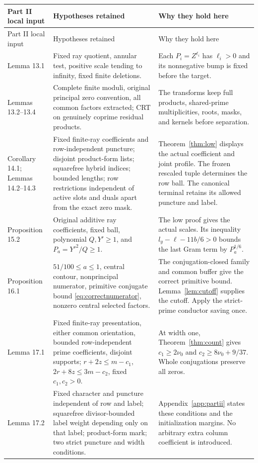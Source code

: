 \begin{longtable}{@{}>{\raggedright\arraybackslash}p{}>{\raggedright\arraybackslash}p{}>{\raggedright\arraybackslash}p{}@{}}
\toprule
Part II local input&Hypotheses retained&Why they hold here\\
\midrule
\endfirsthead
\toprule
Part II local input&Hypotheses retained&Why they hold here\\
\midrule
\endhead
\bottomrule
\endfoot
Lemma 13.1&Fixed ray quotient, annular test, positive scale tending to infinity, fixed finite deletions.&Each $P_i=Z^{\ell_i}$ has $\ell_i>0$ and its nonnegative bump is fixed before the target.\\
Lemmas 13.2--13.4&Complete finite moduli, original principal zero convention, all common factors extracted; CRT on genuinely coprime residual products.&The transforms keep full products, shared-prime multiplicities, roots, masks, and kernels before separation.\\
Corollary 14.1; Lemmas 14.2--14.3&Fixed finite-ray coefficients and row-independent puncture; disjoint product-form lists; squarefree hybrid indices; bounded lengths; row restrictions independent of active slots and duals apart from the exact zero mask.&Theorem~\ref{thm:low} displays the actual coefficient and joint profile. The frozen rescaled tuple determines the row ball. The canonical terminal retains its allowed puncture and label.\\
Proposition 15.2&Original additive ray coefficients, fixed ball, polynomial $Q,Y'\ge1$, and $P_a=Y'^2/Q\ge1$.&The low proof gives the actual scales. Its inequality $l_y-\ell-11b/6>0$ bounds the last Gram term by $P_a^{1/6}$.\\
Proposition 16.1&$51/100\le a\le1$, central contour, nonprincipal numerator, primitive conjugate bound \eqref{eq:correctnumerator}, nonzero central selected factors.&The conjugation-closed family and common buffer give the correct primitive bound. Lemma~\ref{lem:cutoff} supplies the cutoff. Apply the strict-prime conductor saving once.\\
Lemma 17.1&Fixed finite-ray presentation, either common orientation, bounded row-independent prime coefficients, disjoint supports; $r+2z\le m-c_1$, $2r+8z\le3m-c_2$, fixed $c_1,c_2>0$.&At width one, Theorem~\ref{thm:count} gives $c_1\ge2\nu_0$ and $c_2\ge8\nu_0+9/37$. Whole conjugations preserve all zeros.\\
Lemma 17.2&Fixed character and puncture independent of row and label; squarefree divisor-bounded label weight depending only on that label; product-form mark; two strict puncture and width conditions.&Appendix~\ref{app:partii} states these conditions and the initialization margins. No arbitrary extra column coefficient is introduced.\\

\end{longtable}
